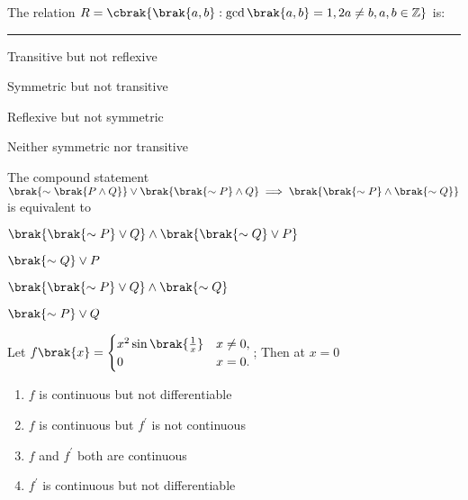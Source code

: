 \iffalse
\title{2023}
\author{EE24Btech11024 - G. Abhimanyu Koushik}
\section{mcq-single}
\fi

\item The relation $R=\cbrak{\brak{a,b}:\gcd\brak{a,b}=1,2a\neq b,a,b\in \mathbb{Z}}$ is:\rule{1cm}{0.15mm} 

\hfill{}
\begin{enumerate}
\begin{multicols}{2}
\item Transitive but not reflexive
\item Symmetric but not transitive
\item Reflexive but not symmetric
\item Neither symmetric nor transitive
\end{multicols}
\end{enumerate}

\item The compound statement $\brak{\sim\brak{P\wedge Q}}\vee\brak{\brak{\sim P}\wedge Q}\implies\brak{\brak{\sim P}\wedge\brak{\sim Q}}$ is equivalent to

\hfill{}
\begin{enumerate}
\begin{multicols}{2}
\item $\brak{\brak{\sim P}\vee Q}\wedge\brak{\brak{\sim Q}\vee P}$
\item $\brak{\sim Q}\vee P$
\item $\brak{\brak{\sim P}\vee Q}\wedge\brak{\sim Q}$
\item $\brak{\sim P}\vee Q$
\end{multicols}
\end{enumerate}

\item Let $f\brak{x} = \begin{cases} x^2\sin\brak{\frac{1}{x}} & x\neq 0, \\0 & x=0 .\end{cases}$; Then at $x=0$

\hfill{}
\begin{enumerate}
\item $f$ is continuous but not differentiable
\item $f$ is continuous but $f^\prime$ is not continuous
\item $f$ and $f^\prime$ both are continuous 
\item $f^\prime$ is continuous but not differentiable
\end{enumerate}

